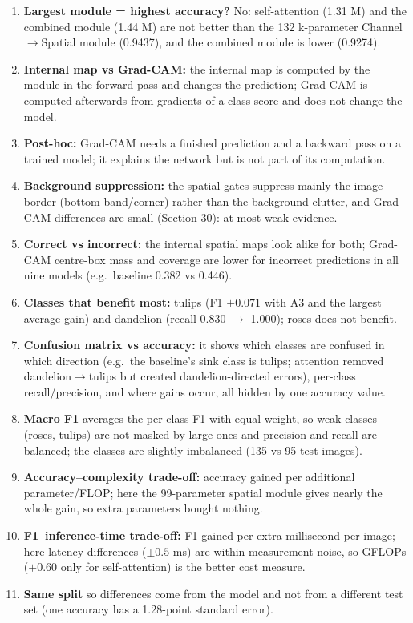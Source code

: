 \documentclass[10pt]{article}
\begin{document}
\begin{enumerate}
\item \textbf{Largest module = highest accuracy?} No: self-attention (1.31 M) and the combined module (1.44 M) are not better than the 132 k-parameter Channel$\to$Spatial module (0.9437), and the combined module is lower (0.9274).
\item \textbf{Internal map vs Grad-CAM:} the internal map is computed by the module in the forward pass and changes the prediction; Grad-CAM is computed afterwards from gradients of a class score and does not change the model.
\item \textbf{Post-hoc:} Grad-CAM needs a finished prediction and a backward pass on a trained model; it explains the network but is not part of its computation.
\item \textbf{Background suppression:} the spatial gates suppress mainly the image border (bottom band/corner) rather than the background clutter, and Grad-CAM differences are small (Section 30): at most weak evidence.
\item \textbf{Correct vs incorrect:} the internal spatial maps look alike for both; Grad-CAM centre-box mass and coverage are lower for incorrect predictions in all nine models (e.g.\ baseline 0.382 vs 0.446).
\item \textbf{Classes that benefit most:} tulips (F1 $+0.071$ with A3 and the largest average gain) and dandelion (recall 0.830 $\to$ 1.000); roses does not benefit.
\item \textbf{Confusion matrix vs accuracy:} it shows which classes are confused in which direction (e.g.\ the baseline's sink class is tulips; attention removed dandelion$\to$tulips but created dandelion-directed errors), per-class recall/precision, and where gains occur, all hidden by one accuracy value.
\item \textbf{Macro F1} averages the per-class F1 with equal weight, so weak classes (roses, tulips) are not masked by large ones and precision and recall are balanced; the classes are slightly imbalanced (135 vs 95 test images).
\item \textbf{Accuracy--complexity trade-off:} accuracy gained per additional parameter/FLOP; here the 99-parameter spatial module gives nearly the whole gain, so extra parameters bought nothing.
\item \textbf{F1--inference-time trade-off:} F1 gained per extra millisecond per image; here latency differences ($\pm0.5$ ms) are within measurement noise, so GFLOPs ($+0.60$ only for self-attention) is the better cost measure.
\item \textbf{Same split} so differences come from the model and not from a different test set (one accuracy has a 1.28-point standard error).

\end{enumerate}
\end{document}
